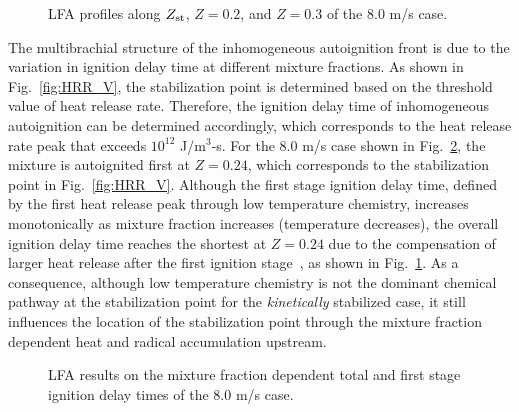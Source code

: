 \documentclass[review,3p,times]{elsarticle}
\begin{document}
\begin{figure}
  \vspace{-1in}
  \centering
  \scriptsize
  
  
  
  
  
  \normalsize
  \caption{LFA profiles along $Z_{\rm st}$, $Z = 0.2$, and $Z = 0.3$ of the $8.0$ m/s case.}
  \label{fig:1D_V}
\end{figure}

The multibrachial structure of the inhomogeneous autoignition front is due to the variation in ignition delay time at different mixture fractions.  As shown in Fig.~\ref{fig:HRR_V}, the stabilization point is determined based on the threshold value of heat release rate.  Therefore, the ignition delay time of inhomogeneous autoignition can be determined accordingly, which corresponds to the heat release rate peak that exceeds $10^{12}$ J/m$^3$-s.  For the $8.0$ m/s case shown in Fig.~\ref{fig:tau}, the mixture is autoignited first at $Z = 0.24$, which corresponds to the stabilization point in Fig.~\ref{fig:HRR_V}.  Although the first stage ignition delay time, defined by the first heat release peak through low temperature chemistry, increases monotonically as mixture fraction increases (temperature decreases), the overall ignition delay time reaches the shortest at $Z = 0.24$ due to the compensation of larger heat release after the first ignition stage~\cite{law12}, as shown in Fig.~\ref{fig:1D_V}.  As a consequence, although low temperature chemistry is not the dominant chemical pathway at the stabilization point for the \emph{kinetically} stabilized case, it still influences the location of the stabilization point through the mixture fraction dependent heat and radical accumulation upstream.    

\begin{figure}
  \vspace{-1in}
  \centering
  \scriptsize
  
  
  \normalsize
  \caption{LFA results on the mixture fraction dependent total and first stage ignition delay times of the $8.0$ m/s case.}
  \label{fig:tau}
\end{figure}              
\end{document}
